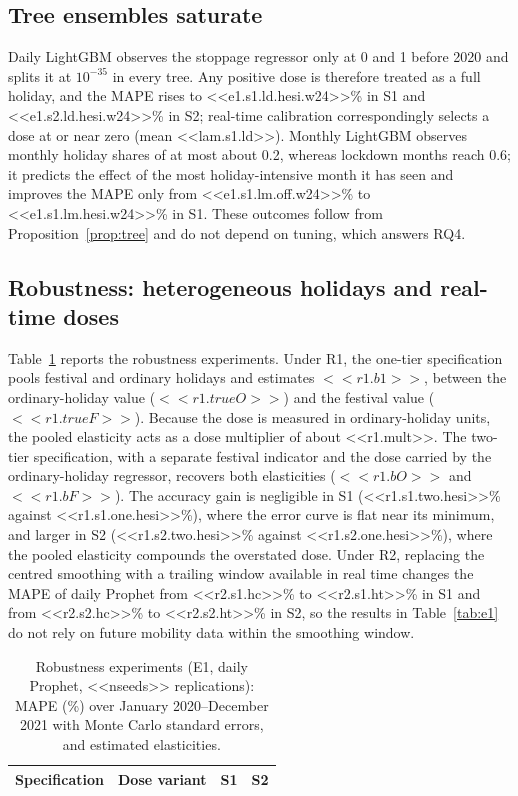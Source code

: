 \documentclass{article}
\theoremstyle{plain}
\theoremstyle{definition}
\theoremstyle{remark}
\begin{document}
\subsection{Tree ensembles saturate}
Daily LightGBM observes the stoppage regressor only at 0 and 1 before 2020 and splits it at $10^{-35}$ in every tree. Any positive dose is therefore treated as a full holiday, and the MAPE rises to <<e1.s1.ld.hesi.w24>>\% in S1 and <<e1.s2.ld.hesi.w24>>\% in S2; real-time calibration correspondingly selects a dose at or near zero (mean <<lam.s1.ld>>). Monthly LightGBM observes monthly holiday shares of at most about 0.2, whereas lockdown months reach 0.6; it predicts the effect of the most holiday-intensive month it has seen and improves the MAPE only from <<e1.s1.lm.off.w24>>\% to <<e1.s1.lm.hesi.w24>>\% in S1. These outcomes follow from Proposition~\ref{prop:tree} and do not depend on tuning, which answers RQ4.

\subsection{Robustness: heterogeneous holidays and real-time doses}\label{sec:robust}
Table~\ref{tab:robust} reports the robustness experiments. Under R1, the one-tier specification pools festival and ordinary holidays and estimates $<<r1.b1>>$, between the ordinary-holiday value ($<<r1.trueO>>$) and the festival value ($<<r1.trueF>>$). Because the dose is measured in ordinary-holiday units, the pooled elasticity acts as a dose multiplier of about <<r1.mult>>. The two-tier specification, with a separate festival indicator and the dose carried by the ordinary-holiday regressor, recovers both elasticities ($<<r1.bO>>$ and $<<r1.bF>>$). The accuracy gain is negligible in S1 (<<r1.s1.two.hesi>>\% against <<r1.s1.one.hesi>>\%), where the error curve is flat near its minimum, and larger in S2 (<<r1.s2.two.hesi>>\% against <<r1.s2.one.hesi>>\%), where the pooled elasticity compounds the overstated dose. Under R2, replacing the centred smoothing with a trailing window available in real time changes the MAPE of daily Prophet from <<r2.s1.hc>>\% to <<r2.s1.ht>>\% in S1 and from <<r2.s2.hc>>\% to <<r2.s2.ht>>\% in S2, so the results in Table~\ref{tab:e1} do not rely on future mobility data within the smoothing window.

\begin{table}[t]
\centering\small
\caption{Robustness experiments (E1, daily Prophet, <<nseeds>> replications): MAPE (\%) over January 2020--December 2021 with Monte Carlo standard errors, and estimated elasticities.}
\label{tab:robust}
\begin{tabular}{llcc}
\toprule
Specification & Dose variant & S1 & S2 \\
\midrule
\bottomrule
\end{tabular}
\end{table}
\end{document}
